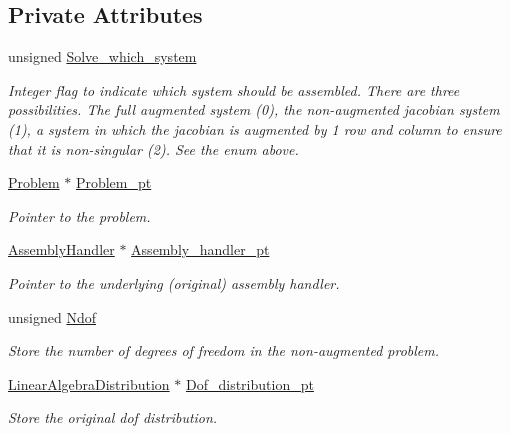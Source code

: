 \subsection*{Private Attributes}
\begin{DoxyCompactItemize}
\item 
unsigned \hyperlink{classoomph_1_1PitchForkHandler_a614de1eea213de58687ed161fc7c53ae}{Solve\+\_\+which\+\_\+system}
\begin{DoxyCompactList}\small\item\em Integer flag to indicate which system should be assembled. There are three possibilities. The full augmented system (0), the non-\/augmented jacobian system (1), a system in which the jacobian is augmented by 1 row and column to ensure that it is non-\/singular (2). See the enum above. \end{DoxyCompactList}\item 
\hyperlink{classoomph_1_1Problem}{Problem} $\ast$ \hyperlink{classoomph_1_1PitchForkHandler_a196adc8e79a66292d2df9bd9093f8f73}{Problem\+\_\+pt}
\begin{DoxyCompactList}\small\item\em Pointer to the problem. \end{DoxyCompactList}\item 
\hyperlink{classoomph_1_1AssemblyHandler}{Assembly\+Handler} $\ast$ \hyperlink{classoomph_1_1PitchForkHandler_a40358960131e00efd6bd0febd397a3ef}{Assembly\+\_\+handler\+\_\+pt}
\begin{DoxyCompactList}\small\item\em Pointer to the underlying (original) assembly handler. \end{DoxyCompactList}\item 
unsigned \hyperlink{classoomph_1_1PitchForkHandler_a9314a176be55e7e9c5a359accfbec751}{Ndof}
\begin{DoxyCompactList}\small\item\em Store the number of degrees of freedom in the non-\/augmented problem. \end{DoxyCompactList}\item 
\hyperlink{classoomph_1_1LinearAlgebraDistribution}{Linear\+Algebra\+Distribution} $\ast$ \hyperlink{classoomph_1_1PitchForkHandler_a075f47b5f8941d25796f96d258a1752e}{Dof\+\_\+distribution\+\_\+pt}
\begin{DoxyCompactList}\small\item\em Store the original dof distribution. \end{DoxyCompactList}\item 

\end{DoxyCompactItemize}
